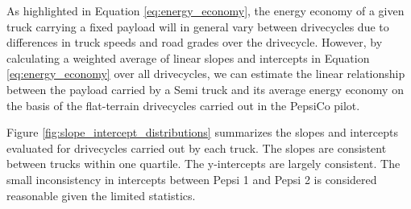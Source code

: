 
As highlighted in Equation \ref{eq:energy_economy}, the energy economy of a given truck carrying a fixed payload will in general vary between drivecycles due to differences in truck speeds and road grades over the drivecycle. However, by calculating a weighted average of linear slopes and intercepts in Equation \ref{eq:energy_economy} over all drivecycles, we can estimate the linear relationship between the payload carried by a Semi truck and its average energy economy on the basis of the flat-terrain drivecycles carried out in the PepsiCo pilot. 

Figure \ref{fig:slope_intercept_distributions} summarizes the slopes and intercepts evaluated for drivecycles carried out by each truck. The slopes are consistent between trucks within one quartile. The y-intercepts are largely consistent. The small inconsistency in intercepts between Pepsi 1 and Pepsi 2 is considered reasonable given the limited statistics. 

